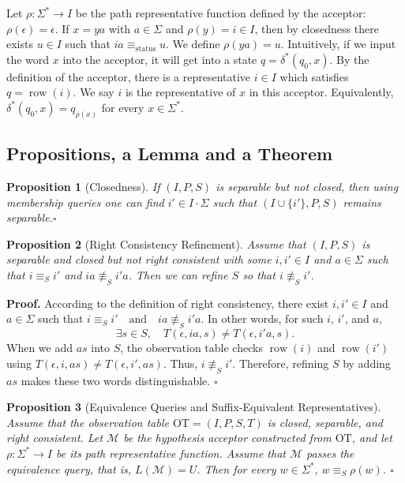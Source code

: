 \documentclass{ieice-tecrep}
\newtheorem{proposition}{Proposition}
\begin{document}
Let \(\rho:\Sigma^*\to I\) be the path representative function defined
by the acceptor: \(\rho(\epsilon)=\epsilon\). If \(x=ya\) with \(a\in\Sigma\) and \(\rho(y)=i\in I\), then by
closedness there exists \(u\in I\) such that \(ia\equiv_{\mathrm{status}}u\). We define \(\rho(ya)=u\). Intuitively, if we input the word \(x\) into the acceptor, it will get
into a state \(q = \delta^*(q_0,x)\). By the definition of the acceptor,
there is a representative \(i \in I\) which satisfies
\(q = \operatorname{row}(i)\). We say \(i\) is the representative of \(x\) in
this acceptor. Equivalently,
\(\delta^*(q_0,x)=q_{\rho(x)}\) for every \(x\in\Sigma^*\).

\subsection{Propositions, a Lemma and a Theorem}\label{propositions-lemma-and-theorem}
\begin{proposition}[Closedness]\label{proposition-1-closedness}
If \((I,P,S)\) is separable but not closed, then
using membership queries one can find \(i' \in I \cdot \Sigma\) such
that \((I \cup \{i'\}, P,S)\) remains separable.\hfill $\square$
\end{proposition}


\begin{proposition}[Right Consistency Refinement]\label{proposition-2.1-right-consistency-refinement}
Assume that \((I,P,S)\) is separable and closed but not
right consistent with some \(i,i' \in I\) and \(a\in \Sigma\) such that \(i\equiv_S i'\) and \(ia \not\equiv_S i'a\). 
Then we can refine \(S\) so that \(i \not\equiv_S i'\).
\end{proposition}
\noindent\textbf{Proof.} According to the definition of right consistency, there
exist \(i,i' \in I\) and \(a\in \Sigma\) such that \(i\equiv_S i' \quad\text{and}\quad ia \not\equiv_S i'a\). In other words, for such \(i\), \(i'\), and \(a\),
\[
\exists s \in S,\quad
T(\epsilon,ia,s) \neq T(\epsilon,i'a,s).
\]
When we add \(as\) into \(S\), the observation table checks
\(\operatorname{row}(i)\) and \(\operatorname{row}(i')\) using \(T(\epsilon,i,as) \neq T(\epsilon,i',as)\). 
Thus, \(i \not\equiv_S i'\). Therefore, refining \(S\) by adding \(as\) makes these two words
distinguishable. \hfill $\square$

\begin{proposition}[Equivalence Queries and Suffix-Equivalent Representatives]\label{proposition-2.2-status-equivalence-implies-suffix-equivalence}
Assume that the observation table
\(\mathrm{OT}=(I,P,S,T)\) is closed, separable, and right consistent.
Let \(\mathcal{M}\) be the hypothesis acceptor constructed from \(\mathrm{OT}\),
and let \(\rho:\Sigma^*\to I\) be its path representative function.
Assume that \(\mathcal{M}\) passes the equivalence query, that is, \(L(\mathcal{M})=U\). Then for every \(w\in\Sigma^*\), \(w\equiv_S\rho(w)\).
\hfill $\square$
\end{proposition}
\end{document}
